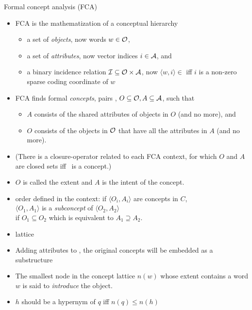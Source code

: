 \documentclass{beamer}
\newlength{\onecolwid}
\begin{document}
\begin{frame}[t]
\begin{columns}[t]
\begin{column}{\onecolwid}
\begin{block}{Formal concept analysis (FCA)} 
  \begin{itemize}
    \item FCA is the mathematization of a conceptual hierarchy 
      \begin{itemize}
        \item a set of \emph{objects}, now words $w\in\mathcal O$, 
        \item a set of \emph{attributes}, now vector indices $i\in\mathcal A$, and
        \item a binary incidence relation 
          $\mathcal I \subseteq \mathcal O \times \mathcal A$,
          now 
          $\langle w,i\rangle\in$
          iff
          $i$ is a  non-zero sparse coding coordinate of $w$
      \end{itemize}
    \item FCA finds formal \emph{concepts}, pairs \oaconc,
      $O\subseteq \mathcal O,A \subseteq \mathcal A$, such that
      \begin{itemize}
        \item $A$ consists of the shared attributes of objects in $O$
          (and no more), and
        \item $O$ consists of
          the objects in $\mathcal O$ that have all the attributes in $A$ (and
          no more).
      \end{itemize}
    \item (There is a closure-operator related to each FCA context, for
      which $O$ and $A$ are closed sets iff \oaconc~is a concept.)
    \item $O$ is called the extent and $A$ is the intent of the concept.  
    \item order defined in the context: 
      if $\langle O_i , A_i \rangle$ are concepts in $C$, \\ 
      $\langle O_1 , A_1 \rangle$ is a \emph{subconcept} of $\langle
      O_2 , A_2 \rangle$ \\
      if $O_1 \subseteq O_2 $ which is equivalent to $A_1 \supseteq A_2 $.  
    \item lattice
    \item Adding attributes to \at,
      the original concepts will be embedded as a substructure 
    \item The smallest node in the concept lattice $n(w)$ whose extent contains a word
      $w$ is said to \emph{introduce} the object.
    \item $h$ should be a hypernym of $q$ iff $n(q)\le n(h)$ 
  \end{itemize}
\end{block} 


\end{column}
\end{columns}
\end{frame}
\end{document}
